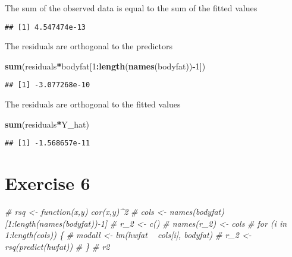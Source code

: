 \documentclass[]{article}
\newenvironment{Shaded}{\begin{snugshade}}{\end{snugshade}}
\newcommand{\CommentTok}[1]{\textcolor[rgb]{0.56,0.35,0.01}{\textit{#1}}}
\newcommand{\DecValTok}[1]{\textcolor[rgb]{0.00,0.00,0.81}{#1}}
\newcommand{\KeywordTok}[1]{\textcolor[rgb]{0.13,0.29,0.53}{\textbf{#1}}}
\newcommand{\NormalTok}[1]{#1}
\newcommand{\OperatorTok}[1]{\textcolor[rgb]{0.81,0.36,0.00}{\textbf{#1}}}
\newcommand{\StringTok}[1]{\textcolor[rgb]{0.31,0.60,0.02}{#1}}
\begin{document}
The sum of the observed data is equal to the sum of the fitted values

\begin{Shaded}
\end{Shaded}

\begin{verbatim}
## [1] 4.547474e-13
\end{verbatim}

The residuals are orthogonal to the predictors

\begin{Shaded}
\begin{Highlighting}[]
\KeywordTok{sum}\NormalTok{(residuals}\OperatorTok{*}\NormalTok{bodyfat[}\DecValTok{1}\OperatorTok{:}\KeywordTok{length}\NormalTok{(}\KeywordTok{names}\NormalTok{(bodyfat))}\OperatorTok{-}\DecValTok{1}\NormalTok{])}
\end{Highlighting}
\end{Shaded}

\begin{verbatim}
## [1] -3.077268e-10
\end{verbatim}

The residuals are orthogonal to the fitted values

\begin{Shaded}
\begin{Highlighting}[]
\KeywordTok{sum}\NormalTok{(residuals}\OperatorTok{*}\NormalTok{Y_hat)}
\end{Highlighting}
\end{Shaded}

\begin{verbatim}
## [1] -1.568657e-11
\end{verbatim}

\hypertarget{exercise-6}{%
\section{Exercise 6}\label{exercise-6}}

\begin{Shaded}
\begin{Highlighting}[]
\CommentTok{# rsq <- function(x,y) cor(x,y)^2}
\CommentTok{# cols <- names(bodyfat)[1:length(names(bodyfat))-1]}
\CommentTok{# r_2 <- c()}
\CommentTok{# names(r_2) <- cols}
\CommentTok{# for (i in 1:length(cols)) \{}
\CommentTok{#     modall <- lm(hwfat ~ cols[i], bodyfat)}
\CommentTok{#     r_2 <- rsq(predict(hwfat))}
\CommentTok{# \}}
\CommentTok{# r2}
\end{Highlighting}
\end{Shaded}
\end{document}
